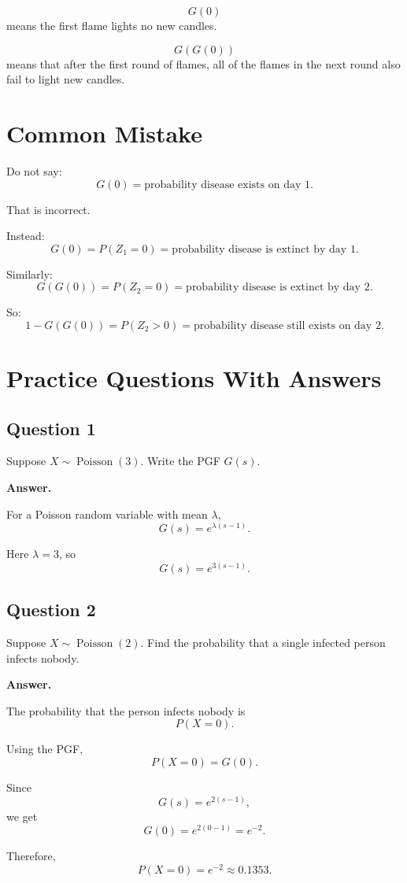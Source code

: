 \documentclass[12pt]{article}
\begin{document}
\[
G(0)
\]
means the first flame lights no new candles.

\[
G(G(0))
\]
means that after the first round of flames, all of the flames in the next round also fail to light new candles.

\section{Common Mistake}

Do not say:
\[
G(0)=\text{probability disease exists on day 1}.
\]

That is incorrect.

Instead:
\[
G(0)=P(Z_1=0)=\text{probability disease is extinct by day 1}.
\]

Similarly:
\[
G(G(0))=P(Z_2=0)=\text{probability disease is extinct by day 2}.
\]

So:
\[
1-G(G(0))=P(Z_2>0)=\text{probability disease still exists on day 2}.
\]

\section{Practice Questions With Answers}

\subsection*{Question 1}

Suppose \(X\sim \operatorname{Poisson}(3)\). Write the PGF \(G(s)\).

\textbf{Answer.}

For a Poisson random variable with mean \(\lambda\),
\[
G(s)=e^{\lambda(s-1)}.
\]

Here \(\lambda=3\), so
\[
\boxed{G(s)=e^{3(s-1)}.}
\]

\subsection*{Question 2}

Suppose \(X\sim \operatorname{Poisson}(2)\). Find the probability that a single infected person infects nobody.

\textbf{Answer.}

The probability that the person infects nobody is
\[
P(X=0).
\]

Using the PGF,
\[
P(X=0)=G(0).
\]

Since
\[
G(s)=e^{2(s-1)},
\]
we get
\[
G(0)=e^{2(0-1)}=e^{-2}.
\]

Therefore,
\[
\boxed{P(X=0)=e^{-2}\approx 0.1353.}
\]
\end{document}
